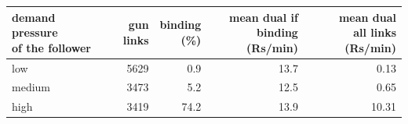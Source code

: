 \begin{tabular}{@{}lrrrr@{}}
\toprule
\shortstack[l]{demand pressure\\of the follower} & gun links & \shortstack[r]{binding\\(\%)} & \shortstack[r]{mean dual if\\binding (Rs/min)} & \shortstack[r]{mean dual\\all links (Rs/min)} \\
\midrule
low & 5629 & 0.9 & 13.7 & 0.13 \\
medium & 3473 & 5.2 & 12.5 & 0.65 \\
high & 3419 & 74.2 & 13.9 & 10.31 \\
\bottomrule
\end{tabular}
